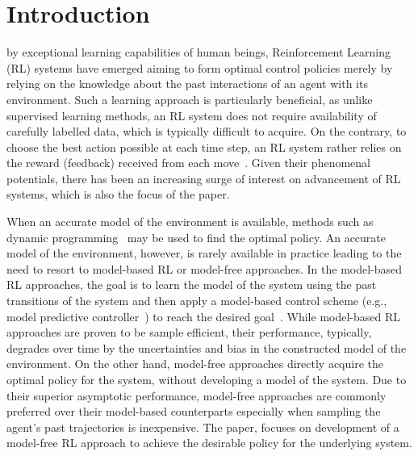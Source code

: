\documentclass{ieeeaccess}
\begin{document}
\maketitle
\section{Introduction} \label{sec:Introduction}
 by exceptional learning capabilities of human beings, Reinforcement Learning (RL) systems have emerged aiming to form  optimal control policies merely by relying on the knowledge about the past interactions of an agent with its environment. Such a learning approach is particularly beneficial, as unlike supervised learning methods, an RL system does not require availability of carefully labelled data, which is typically difficult to acquire. On the contrary, to choose the best action possible at each time step, an RL system rather relies on the reward (feedback) received from each move~\cite{Spano, Seo, DrMing1, DrMing2}. Given their phenomenal potentials, there has been an increasing surge of interest on advancement of RL systems, which is also the focus of the paper.

When an accurate model of the environment is available, methods such as dynamic programming~\cite{1} may be used to find the optimal policy. An accurate model of the environment, however, is rarely available in practice leading to the need to resort to model-based RL or model-free approaches. In the model-based RL approaches, the goal is to learn the model of the system using the past transitions of the system and then apply a model-based control scheme (e.g., model predictive controller~\cite{2}) to reach the desired goal~\cite{3}. While model-based RL approaches are proven to be sample efficient, their performance, typically, degrades over time by the uncertainties and bias in the constructed model of the environment. On the other hand, model-free approaches directly acquire the optimal policy for the system, without developing a model of the system. Due to their superior asymptotic performance, model-free approaches are commonly preferred over their model-based counterparts especially when sampling the agent's past trajectories is inexpensive. The paper, focuses on development of a model-free RL approach to achieve the desirable policy for the underlying system.
\end{document}
